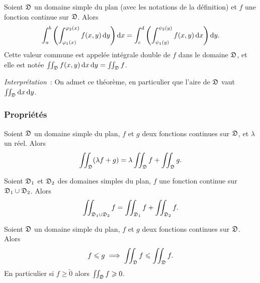 \begin{defdef}
  Soient $\mathfrak{D}$ un domaine simple du plan (avec les notations de la définition) et $f$ une fonction continue sur $\mathfrak{D}$. Alors
  \begin{equation}
    \int_{a}^{b} \left( \int_{\varphi_1(x)}^{\varphi_2(x)} f(x,y)\mathop{}\mathopen{}\mathrm{d} y\right)\mathop{}\mathopen{}\mathrm{d} x = \int_{c}^{d} \left( \int_{\psi_1(y)}^{\psi_2(y)} f(x,y)\mathop{}\mathopen{}\mathrm{d} x\right)\mathop{}\mathopen{}\mathrm{d} y.
  \end{equation}
  Cette valeur commune est appelée intégrale double de $f$ dans le domaine $\mathfrak{D}$, et elle est notée $\iint_{\mathfrak{D}} f(x,y)\mathop{}\mathopen{}\mathrm{d} x \mathop{}\mathopen{}\mathrm{d} y = \iint_{\mathfrak{D}} f$.
\end{defdef}

\emph{Interprétation}~: On admet ce théorème, en particulier que l'aire de $\mathfrak{D}$ vaut $\iint_{\mathfrak{D}}\mathop{}\mathopen{}\mathrm{d} x \mathop{}\mathopen{}\mathrm{d} y$.

\subsubsection{Propriétés}

\begin{prop}[Linéarité]
  Soient $\mathfrak{D}$ un domaine simple du plan, $f$ et $g$ deux fonctions continues sur $\mathfrak{D}$, et $\lambda$ un réel. Alors
  \begin{equation}
    \iint_{\mathfrak{D}}(\lambda f+g) = \lambda \iint_{\mathfrak{D}} f + \iint_{\mathfrak{D}} g.
  \end{equation}
\end{prop}
\begin{prop}
  Soient $\mathfrak{D}_1$ et $\mathfrak{D}_2$ des domaines simples du plan, $f$ une fonction continue sur $\mathfrak{D}_1 \cup \mathfrak{D}_2$. Alors
  \begin{equation}
    \iint_{\mathfrak{D}_1 \cup \mathfrak{D}_2} f = \iint_{\mathfrak{D}_1} f + \iint_{\mathfrak{D}_2} f.
  \end{equation}
\end{prop}
\begin{prop}[Croissance]
  Soient $\mathfrak{D}$ un domaine simple du plan, $f$ et $g$ deux fonctions continues sur $\mathfrak{D}$. Alors
  \begin{equation}
    f \leqslant g \implies \iint_{\mathfrak{D}} f \leqslant \iint_{\mathfrak{D}} f.
  \end{equation}
  En particulier si $f \geqslant \tilde{0}$ alors $\iint_{\mathfrak{D}} f \geqslant 0$.
\end{prop}

